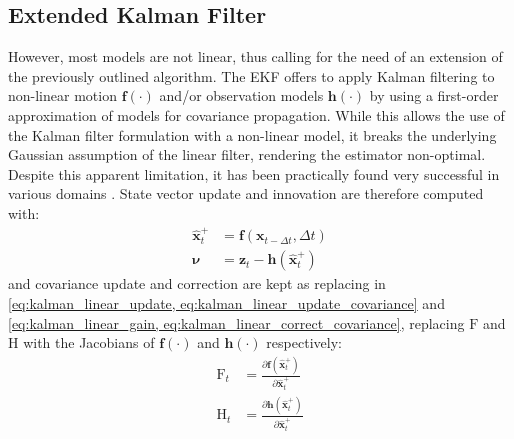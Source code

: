 \subsection{Extended Kalman Filter}

However, most models are not linear, thus calling for the need of an extension of the previously outlined algorithm. The \gls{EKF} offers to apply Kalman filtering to non-linear motion $\boldsymbol{f}(\cdot)$ and/or observation models $\boldsymbol{h}(\cdot)$ by using a first-order approximation of models for covariance propagation. While this allows the use of the Kalman filter formulation with a non-linear model, it breaks the underlying Gaussian assumption of the linear filter, rendering the estimator non-optimal. Despite this apparent limitation, it has been practically found very successful in various domains \cite{corke_robotics_2017}. State vector update and innovation are therefore computed with:
\begin{align}
    \hat{\boldsymbol{x}}^{+}_t &= \boldsymbol{f}( \boldsymbol{x}_{t-\Delta t}, \Delta t) \label{eq:ekf_update} \\
    \boldsymbol{\nu} &= \boldsymbol{z}_{t} - \boldsymbol{h}(\hat{\boldsymbol{x}}^{+}_t) \label{eq:ekf_innovation}
\end{align}
and covariance update and correction are kept as replacing in \cref{eq:kalman_linear_update, eq:kalman_linear_update_covariance} and \cref{eq:kalman_linear_gain, eq:kalman_linear_correct_covariance}, replacing $\text{F}$ and $\text{H}$ with the Jacobians of $\boldsymbol{f}(\cdot)$ and $\boldsymbol{h}(\cdot)$ respectively:
\begin{align}
    \text{F}_t &= \frac{ \partial\boldsymbol{f}(\hat{\boldsymbol{x}}^{+}_t) }{ \partial\hat{\boldsymbol{x}}^{+}_t } \\
    \text{H}_t &= \frac{ \partial\boldsymbol{h}(\hat{\boldsymbol{x}}^{+}_t) }{ \partial\hat{\boldsymbol{x}}^{+}_t }
\end{align}

